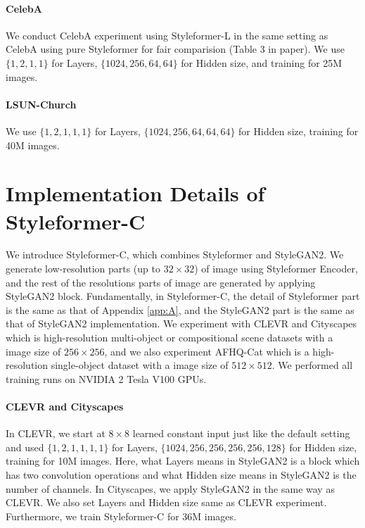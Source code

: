 \documentclass[10pt,twocolumn,letterpaper]{article}
\begin{document}
\paragraph{CelebA}
We conduct CelebA experiment using Styleformer-L in the same setting as CelebA using pure Styleformer for fair comparision (Table 3 in paper). We use $\{1,2,1,1\}$ for Layers, $\{1024,256,64,64\}$ for Hidden size, and training for 25M images.


\paragraph{LSUN-Church} 
We use $\{1,2,1,1,1\}$ for Layers, $\{1024,256,64,64,64\}$ for Hidden size, training for 40M images.


\section{Implementation Details of Styleformer-C}
\label{app:F}
We introduce Styleformer-C, which combines Styleformer and StyleGAN2. We generate low-resolution parts (up to $32 \times 32$) of image using Styleformer Encoder, and the rest of the resolutions parts of image are generated by applying StyleGAN2 block. Fundamentally, in Styleformer-C, the detail of Styleformer part is the same as that of Appendix \ref{app:A}, and the StyleGAN2 part is the same as that of StyleGAN2 \cite{karras2020analyzing} implementation. We experiment with CLEVR and Cityscapes which is high-resolution multi-object or compositional scene datasets with a image size of $256 \times 256$, and we also experiment AFHQ-Cat which is a high-resolution single-object dataset with a image size of $512 \times 512$. We performed all training runs on NVIDIA 2 Tesla V100 GPUs.

\paragraph{CLEVR and Cityscapes}
In CLEVR, we start at $8 \times 8$ learned constant input just like the default setting and used $\{1,2,1,1,1,1\}$ for Layers, $\{1024,256,256,256,256,128\}$ for Hidden size, training for 10M images. Here, what Layers means in StyleGAN2 is a block which has two convolution operations and what Hidden size means in StyleGAN2 is the number of channels. In Cityscapes, we apply StyleGAN2 in the same way as CLEVR. We also set Layers and Hidden size same as CLEVR experiment. Furthermore, we train Styleformer-C for 36M images.
\end{document}
